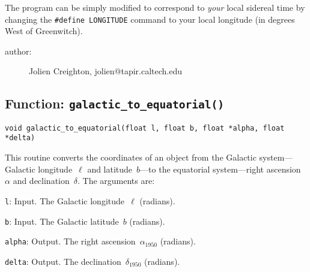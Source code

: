 The program can be simply modified to correspond to \emph{your} local
sidereal time by changing the \verb|#define LONGITUDE| command to your
local longitude (in degrees West of Greenwitch).

\begin{description}
\item[author:] Jolien Creighton, jolien@tapir.caltech.edu
\end{description}

\clearpage
{}

\clearpage
\subsection{Function: \texttt{galactic\_to\_equatorial()}}
\label{ss:galactic_to_equatorial}

\begin{verbatim}
void galactic_to_equatorial(float l, float b, float *alpha, float *delta)
\end{verbatim}

This routine converts the coordinates of an object from the Galactic
system---Galactic longitude~$\ell$ and latitude~$b$---to the equatorial
system---right ascension~$\alpha$ and declination~$\delta$.  The arguments are:
\begin{description}
\item{\texttt{l}}: Input.  The Galactic longitude~$\ell$ (radians).
\item{\texttt{b}}: Input.  The Galactic latitude~$b$ (radians).
\item{\texttt{alpha}}: Output.  The right ascension~$\alpha_{1950}$ (radians).
\item{\texttt{delta}}: Output.  The declination~$\delta_{1950}$ (radians).
\end{description}

